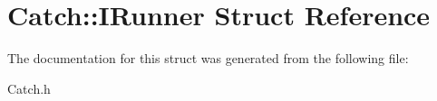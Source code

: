 \hypertarget{struct_catch_1_1_i_runner}{\section{Catch\-:\-:I\-Runner Struct Reference}
\label{struct_catch_1_1_i_runner}
}


The documentation for this struct was generated from the following file\-:\begin{DoxyCompactItemize}
\item 
Catch.\-h\end{DoxyCompactItemize}
